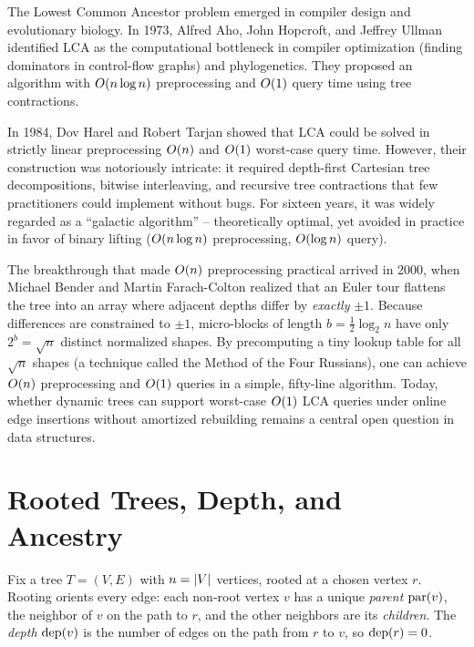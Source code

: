\begin{historybox}
The Lowest Common Ancestor problem emerged in compiler design and evolutionary biology.
In 1973, Alfred Aho, John Hopcroft, and Jeffrey Ullman identified LCA as the computational
bottleneck in compiler optimization (finding dominators in control-flow graphs) and
phylogenetics. They proposed an algorithm with $O(n \log n)$ preprocessing and $O(1)$
query time using tree contractions.

In 1984, Dov Harel and Robert Tarjan showed that LCA could be
solved in strictly linear preprocessing $O(n)$ and $O(1)$ worst-case query time.
However, their construction was notoriously intricate: it required depth-first Cartesian
tree decompositions, bitwise interleaving, and recursive tree contractions that few
practitioners could implement without bugs. For sixteen years, it was widely regarded as
a ``galactic algorithm'' -- theoretically optimal, yet avoided in practice in favor of
binary lifting ($O(n \log n)$ preprocessing, $O(\log n)$ query).

The breakthrough that made $O(n)$ preprocessing practical arrived in 2000, when
Michael Bender and Martin Farach-Colton realized that an Euler tour flattens the tree
into an array where adjacent depths differ by \emph{exactly} $\pm 1$. Because differences
are constrained to $\pm 1$, micro-blocks of length $b = \tfrac{1}{2}\log_2 n$ have only
$2^b = \sqrt{n}$ distinct normalized shapes. By precomputing a tiny lookup table for all $\sqrt{n}$ shapes (a technique called the Method of the Four Russians), one can
achieve $O(n)$ preprocessing
and $O(1)$ queries in a simple, fifty-line algorithm. Today, whether dynamic trees can
support worst-case $O(1)$ LCA queries under online edge insertions without amortized
rebuilding remains a central open question in data structures.
\end{historybox}

\chapterline

\section{Rooted Trees, Depth, and Ancestry}
\label{ch23:setup}

Fix a tree $T=(V,E)$ with $n=\lvert V\rvert$ vertices, rooted at a chosen vertex $r$. Rooting
orients every edge: each non-root vertex $v$ has a unique \emph{parent} $\operatorname{par}(v)$, the
neighbor of $v$ on the path to $r$, and the other neighbors are its \emph{children}. The
\emph{depth} $\operatorname{dep}(v)$ is the number of edges on the path from $r$ to $v$, so $\operatorname{dep}(r)=0$.


